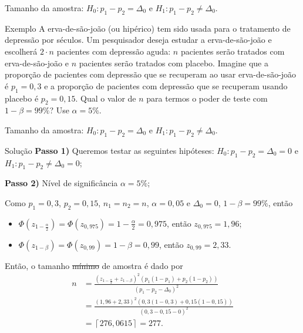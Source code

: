 \documentclass[9pt]{beamer}
\begin{document}
\begin{frame}{Tamanho da amostra: $H_0:p_1 - p_2 = \Delta_0$ e $H_1: p_1 - p_2 \neq \Delta_0$.}

\large
\begin{block}{Exemplo}
	A erva-de-são-joão (ou hipérico) tem sido usada para o tratamento de depressão por séculos. Um pesquisador deseja estudar a erva-de-são-joão e escolherá $2\cdot n$ pacientes com depressão aguda: $n$ pacientes serão tratados com erva-de-são-joão e $n$ pacientes serão tratados com placebo. 
	Imagine que a proporção de pacientes com depressão que se recuperam ao usar erva-de-são-joão é $p_1 = 0,3$ e a proporção de pacientes com depressão que se recuperam usando placebo é $p_2 = 0,15$. 
	Qual o valor de $n$ para termos o poder de teste com $1-\beta = 99\%$? Use $\alpha=5\%$.
\end{block}
\normalsize

\end{frame}

\begin{frame}{Tamanho da amostra: $H_0:p_1 - p_2 = \Delta_0$ e $H_1: p_1 - p_2 \neq \Delta_0$.}

\normalsize
\begin{block}{Solução}
	\textbf{Passo 1)} Queremos testar as seguintes hipóteses: $H_0: p_1 - p_2 = \Delta_0=0$ e $H_1: p_1 - p_2 \neq \Delta_0=0$;
	
	\textbf{Passo 2)} Nível de significância $\alpha=5\%$;
	
	Como $p_1 = 0,3$, $p_2=0,15$, $n_1=n_2=n$, $\alpha = 0,05$ e $\Delta_0=0$, $1-\beta=99\%$, então
	\begin{itemize}
		\item $\Phi\left( z_{1-\frac{\alpha}{2}}\right) = \Phi\left( z_{0,975}\right) =1- \frac{\alpha}{2} = 0,975$, então $z_{0,975} = 1,96$;
		\item $\Phi\left( z_{1-\beta}\right) = \Phi\left( z_{0,99}\right) =1- \beta = 0,99$, então $z_{0,99} = 2,33$.
	\end{itemize}
	
	Então, o tamanho \sout{mínimo} de amostra é dado por
	\begin{align*}
		n &= \frac{(z_{1-\frac{\alpha}{2}} + z_{1-\beta})^2 \left( p_1(1 - p_1) + p_2(1 - p_2) \right)}{\left(p_1 - p_2 - \Delta_0\right)^2}\\
		&= \frac{(1,96 + 2,33)^2 \left( 0,3(1 - 0,3) + 0,15(1 - 0,15) \right)}{\left(0,3 - 0,15 - 0\right)^2}\\
		&= \left \lceil 276,0615 \right\rceil = 277.
	\end{align*}
\end{block}
\normalsize

\end{frame}
\end{document}
